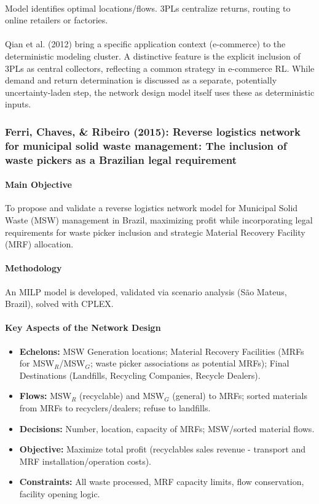 \paragraph{} Model identifies optimal locations/flows. 3PLs centralize returns, routing to online retailers or factories.

\paragraph{} Qian et al. (2012) bring a specific application context (e-commerce) to the deterministic modeling cluster. A distinctive feature is the explicit inclusion of 3PLs as central collectors, reflecting a common strategy in e-commerce RL. While demand and return determination is discussed as a separate, potentially uncertainty-laden step, the network design model itself uses these as deterministic inputs.

\subsubsection{Ferri, Chaves, \& Ribeiro (2015): Reverse logistics network for municipal solid waste management: The inclusion of waste pickers as a Brazilian legal requirement}
\paragraph{Main Objective} To propose and validate a reverse logistics network model for Municipal Solid Waste (MSW) management in Brazil, maximizing profit while incorporating legal requirements for waste picker inclusion and strategic Material Recovery Facility (MRF) allocation.
\paragraph{Methodology} An MILP model is developed, validated via scenario analysis (São Mateus, Brazil), solved with CPLEX.
\paragraph{Key Aspects of the Network Design}
\begin{itemize}
    \item \textbf{Echelons:} MSW Generation locations; Material Recovery Facilities (MRFs for MSW$_{R}$/MSW$_{G}$; waste picker associations as potential MRFs); Final Destinations (Landfills, Recycling Companies, Recycle Dealers).
    \item \textbf{Flows:} MSW$_{R}$ (recyclable) and MSW$_{G}$ (general) to MRFs; sorted materials from MRFs to recyclers/dealers; refuse to landfills.
    \item \textbf{Decisions:} Number, location, capacity of MRFs; MSW/sorted material flows.
    \item \textbf{Objective:} Maximize total profit (recyclables sales revenue - transport and MRF installation/operation costs).
    \item \textbf{Constraints:} All waste processed, MRF capacity limits, flow conservation, facility opening logic.
\end{itemize}
